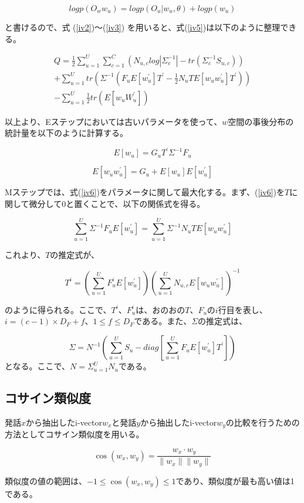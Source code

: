 \begin{equation}
logp(O_w w_u)=logp(O_u|w_u,\theta)+logp(w_u)
\end{equation}

と書けるので、式 (\ref{iv2})〜(\ref{iv3}) を用いると、式(\ref{iv5})は以下のように整理できる。

\begin{equation}
\label{iv6}
\begin{split}
Q=\frac{1}{2}\sum_{u=1}^{U}\sum_{c=1}^{C}(N_{u,c} log\left|\Sigma_c^{-1}\right|-tr(\Sigma_c^{-1}S_{u,c}))\\
+\sum_{u=1}^{U}tr\left( \Sigma^{-1}\left( F_uE[w_u^\prime]T^\prime -\frac{1}{2}N_uTE[w_uw_u^\prime]T^\prime \right) \right)\\
-\sum_{u=1}^{U}\frac{1}{2}tr(E[w_uW_u^\prime])
\end{split}
\end{equation}

以上より、Eステップにおいては古いパラメータを使って、$w$空間の事後分布の統計量を以下のように計算する。

\begin{equation}
E[w_u]=G_uT^\prime\Sigma^{-1}F_u
\end{equation}

\begin{equation}
E[w_uw_u^\prime]=G_u+E[w_u]E[w_u^\prime]
\end{equation}

Mステップでは、式(\ref{iv6})をパラメータに関して最大化する。まず、(\ref{iv6})を$T$に関して微分して0と置くことで、以下の関係式を得る。

\begin{equation}
\sum_{u=1}^{U}\Sigma^{-1}F_uE[w_u^\prime]=\sum_{u=1}^{U}\Sigma^{-1}N_uTE[w_uw_u^\prime]
\end{equation}

これより、$T$の推定式が、

\begin{equation}
T^i=\left(\sum_{u=1}^{U}F_u^iE[w_u^\prime] \right)\left(\sum_{u=1}^{U}N_{u,c}E[w_uw_u^\prime] \right)^{-1}
\end{equation}

のように得られる。ここで、$T^i$、$F_u^i$は、おのおの$T$、$F_u$の$i$行目を表し、$i=(c-1)\times D_F+f$、$1\leq f\leq D_F$である。また、$\Sigma$の推定式は、

\begin{equation}
\Sigma=N^{-1}\left(\sum_{u=1}^{U}S_u-diag\left[\sum_{u=1}^{U}F_uE[w_u^\prime]T^\prime \right] \right)
\end{equation}
となる。ここで、$N=\Sigma_{u=1}^{U}N_u$である。

\subsection{コサイン類似度}
発話$x$から抽出したi-vector$w_x$と発話$y$から抽出したi-vector$w_y$の比較を行うための方法としてコサイン類似度を用いる。

\begin{equation}
\cos(w_x,w_y)=\frac{w_x\cdot w_y}{\parallel w_x\parallel\parallel w_y\parallel}
\end{equation}

類似度の値の範囲は、$-1\leq \cos(w_x,w_y)\leq 1$であり、類似度が最も高い値は1である。

